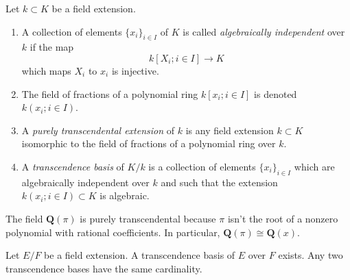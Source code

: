 \begin{definition}
\label{definition-transcendence}
Let $k \subset K$ be a field extension.
\begin{enumerate}
\item A collection of elements $\{x_i\}_{i \in I}$ of $K$ is called
{\it algebraically independent} over $k$ if the map
$$
k[X_i; i\in I] \longrightarrow K
$$
which maps $X_i$ to $x_i$ is injective.
\item The field of fractions of a polynomial ring
$k[x_i; i \in I]$ is denoted $k(x_i; i\in I)$.
\item A {\it purely transcendental extension} of $k$ is any
field extension $k \subset K$ isomorphic to the field of
fractions of a polynomial ring over $k$.
\item A {\it transcendence basis} of $K/k$ is a
collection of elements $\{x_i\}_{i \in I}$ which are
algebraically independent over $k$ and such that
the extension $k(x_i; i\in I) \subset K$ is algebraic.
\end{enumerate}
\end{definition}

\begin{example}
\label{example-pi-transcendental}
The field $\mathbf{Q}(\pi)$ is purely transcendental because
$\pi$ isn't the root of a nonzero polynomial with rational coefficients.
In particular, $\mathbf{Q}(\pi) \cong \mathbf{Q}(x)$.
\end{example}

\begin{lemma}
\label{lemma-transcendence-degree}
Let $E/F$ be a field extension. A transcendence basis of $E$ over $F$ exists.
Any two transcendence bases have the same cardinality.
\end{lemma}

